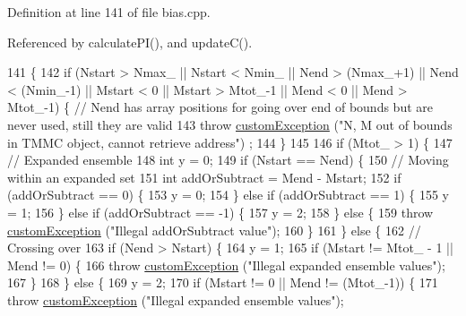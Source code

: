 Definition at line 141 of file bias.\-cpp.



Referenced by calculate\-P\-I(), and update\-C().


\begin{DoxyCode}
141                                                                                                            
             \{
142     \textcolor{keywordflow}{if} (Nstart > Nmax\_ || Nstart < Nmin\_ || Nend > (Nmax\_+1) || Nend < (Nmin\_-1) || Mstart < 0 || Mstart > 
      Mtot\_-1 || Mend < 0 || Mend > Mtot\_-1) \{ \textcolor{comment}{// Nend has array positions for going over end of bounds but are
       never used, still they are valid}
143         \textcolor{keywordflow}{throw} \hyperlink{classcustom_exception}{customException} (\textcolor{stringliteral}{"N, M out of bounds in TMMC object, cannot retrieve address"})
      ;
144     \}
145 
146     \textcolor{keywordflow}{if} (Mtot\_ > 1) \{
147         \textcolor{comment}{// Expanded ensemble}
148         \textcolor{keywordtype}{int} y = 0;
149         \textcolor{keywordflow}{if} (Nstart == Nend) \{
150             \textcolor{comment}{// Moving within an expanded set}
151             \textcolor{keywordtype}{int} addOrSubtract = Mend - Mstart;
152             \textcolor{keywordflow}{if} (addOrSubtract == 0) \{
153                 y = 0;
154             \} \textcolor{keywordflow}{else} \textcolor{keywordflow}{if} (addOrSubtract == 1) \{
155                 y = 1;
156             \} \textcolor{keywordflow}{else} \textcolor{keywordflow}{if} (addOrSubtract == -1) \{
157                 y = 2;
158             \} \textcolor{keywordflow}{else} \{
159                 \textcolor{keywordflow}{throw} \hyperlink{classcustom_exception}{customException} (\textcolor{stringliteral}{"Illegal addOrSubtract value"});
160             \}
161         \} \textcolor{keywordflow}{else} \{
162             \textcolor{comment}{// Crossing over}
163             \textcolor{keywordflow}{if} (Nend > Nstart) \{
164                 y = 1;
165                 \textcolor{keywordflow}{if} (Mstart != Mtot\_ - 1 || Mend != 0) \{
166                     \textcolor{keywordflow}{throw} \hyperlink{classcustom_exception}{customException} (\textcolor{stringliteral}{"Illegal expanded ensemble values"});
167                 \}
168             \} \textcolor{keywordflow}{else} \{
169                 y = 2;
170                 \textcolor{keywordflow}{if} (Mstart != 0 || Mend != (Mtot\_-1)) \{
171                     \textcolor{keywordflow}{throw} \hyperlink{classcustom_exception}{customException} (\textcolor{stringliteral}{"Illegal expanded ensemble values"});

\end{DoxyCode}
